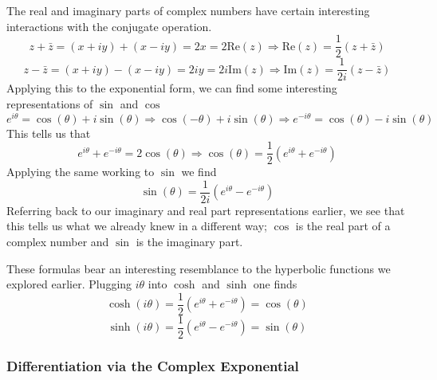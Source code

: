 \documentclass[12pt]{report}
\begin{document}
\begin{flushleft}
The real and imaginary parts of complex numbers have certain interesting 
interactions with the conjugate operation.
\[z + \bar{z} = (x + iy) + (x - iy) = 2x = 2 \mathrm{Re}(z) \Rightarrow 
\mathrm{Re}(z) = \frac{1}{2}(z + \bar{z})\]
\[z - \bar{z} = (x + iy) - (x - iy) = 2iy = 2i\mathrm{Im}(z) \Rightarrow
\mathrm{Im}(z) = \frac{1}{2i}(z - \bar{z})\]
Applying this to the exponential form, we can find some interesting 
representations of \(\sin\) and \(\cos\)
\[e^{i\theta} = \cos(\theta) + i\sin(\theta) \Rightarrow \cos(-\theta) + 
i\sin(\theta) \Rightarrow e^{-i\theta} = \cos(\theta) - i\sin(\theta)\]
This tells us that
\[e^{i\theta} + e^{-i\theta} = 2\cos(\theta) \Rightarrow \cos(\theta) = 
\frac{1}{2}\left(e^{i\theta} + e^{-i\theta}\right)\]
Applying the same working to \(\sin\) we find
\[\sin(\theta) = \frac{1}{2i}\left(e^{i\theta} - e^{-i\theta}\right)\]
Referring back to our imaginary and real part representations earlier, we
see that this tells us what we already knew in a different way; \(\cos\) is
the real part of a complex number and \(\sin\) is the imaginary part. \par
These formulas bear an interesting resemblance to the hyperbolic functions
we explored earlier. Plugging \(i\theta\) into \(\cosh\) and \(\sinh\) one 
finds
\[\cosh(i\theta) = \frac{1}{2}\left(e^{i\theta} + e^{-i\theta}\right) =
\cos(\theta)\]
\[\sinh(i\theta) = \frac{1}{2}\left(e^{i\theta} - e^{-i\theta}\right) =
\sin(\theta)\]

\subsubsection*{Differentiation via the Complex Exponential}


\end{flushleft}
\end{document}
